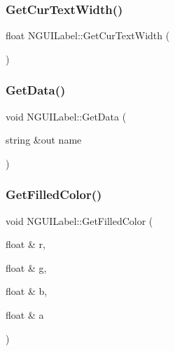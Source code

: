 \hypertarget{class_n_g_u_i_label_a3443cdc96fe1f3d4a3dec5ed41d2c15e}{}\label{class_n_g_u_i_label_a3443cdc96fe1f3d4a3dec5ed41d2c15e} 
\subsubsection{\texorpdfstring{Get\+Cur\+Text\+Width()}{GetCurTextWidth()}}
{\footnotesize\ttfamily float N\+G\+U\+I\+Label\+::\+Get\+Cur\+Text\+Width (\begin{DoxyParamCaption}{ }\end{DoxyParamCaption})}

\hypertarget{class_n_g_u_i_label_afaaaa017c5889e0803ca353a91d713c0}{}\label{class_n_g_u_i_label_afaaaa017c5889e0803ca353a91d713c0} 
\subsubsection{\texorpdfstring{Get\+Data()}{GetData()}}
{\footnotesize\ttfamily void N\+G\+U\+I\+Label\+::\+Get\+Data (\begin{DoxyParamCaption}\item[{string \&out}]{name }\end{DoxyParamCaption})}

\hypertarget{class_n_g_u_i_label_a6804cd7f850215528d5f738e259b1a77}{}\label{class_n_g_u_i_label_a6804cd7f850215528d5f738e259b1a77} 
\subsubsection{\texorpdfstring{Get\+Filled\+Color()}{GetFilledColor()}}
{\footnotesize\ttfamily void N\+G\+U\+I\+Label\+::\+Get\+Filled\+Color (\begin{DoxyParamCaption}\item[{float \&}]{r,  }\item[{float \&}]{g,  }\item[{float \&}]{b,  }\item[{float \&}]{a }\end{DoxyParamCaption})}

